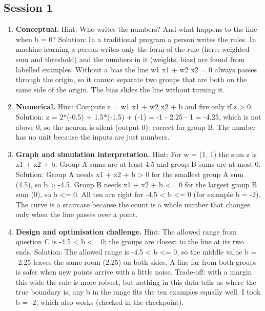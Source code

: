 \documentclass[11pt,a4paper]{article}
\begin{document}
\subsection*{Session 1}
\begin{enumerate}[nosep]
\item \textbf{Conceptual.} Hint: Who writes the numbers? And what happens to the line when b = 0? Solution: In a traditional program a person writes the rules. In machine learning a person writes only the form of the rule (here: weighted sum and threshold) and the numbers in it (weights, bias) are found from labelled examples. Without a bias the line w1 x1 + w2 x2 = 0 always passes through the origin, so it cannot separate two groups that are both on the same side of the origin. The bias slides the line without turning it.
\item \textbf{Numerical.} Hint: Compute z = w1 x1 + w2 x2 + b and fire only if z \textgreater{} 0. Solution: z = 2*(-0.5) + 1.5*(-1.5) + (-1) = -1 - 2.25 - 1 = -4.25, which is not above 0, so the neuron is silent (output 0): correct for group B. The number has no unit because the inputs are just numbers.
\item \textbf{Graph and simulation interpretation.} Hint: For w = (1, 1) the sum z is x1 + x2 + b. Group A sums are at least 4.5 and group B sums are at most 0. Solution: Group A needs x1 + x2 + b \textgreater{} 0 for the smallest group A sum (4.5), so b \textgreater{} -4.5. Group B needs x1 + x2 + b \textless{}= 0 for the largest group B sum (0), so b \textless{}= 0. All ten are right for -4.5 \textless{} b \textless{}= 0 (for example b = -2). The curve is a staircase because the count is a whole number that changes only when the line passes over a point.
\item \textbf{Design and optimisation challenge.} Hint: The allowed range from question C is -4.5 \textless{} b \textless{}= 0; the groups are closest to the line at its two ends. Solution: The allowed range is -4.5 \textless{} b \textless{}= 0, so the middle value b = -2.25 leaves the same room (2.25) on both sides. A line far from both groups is safer when new points arrive with a little noise. Trade-off: with a margin this wide the rule is more robust, but nothing in this data tells us where the true boundary is; any b in the range fits the ten examples equally well. I took b = -2, which also works (checked in the checkpoint).
\end{enumerate}
\end{document}
